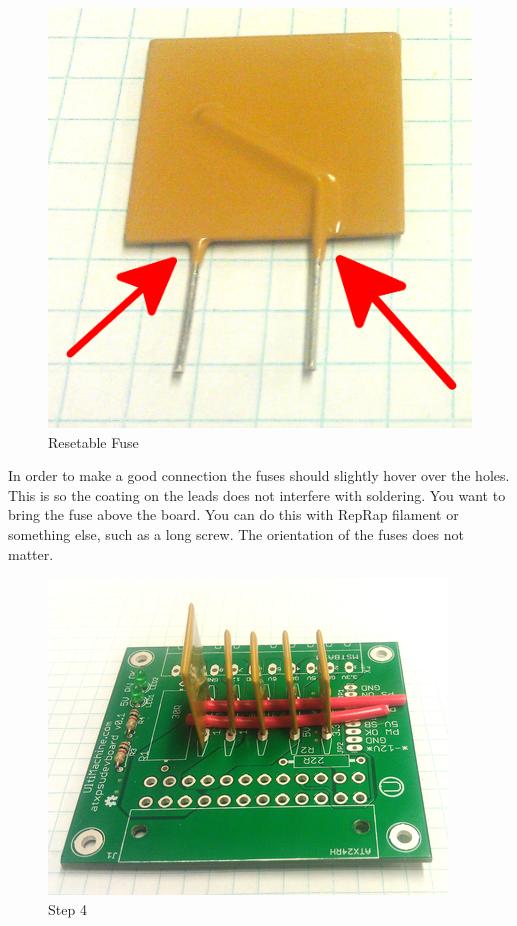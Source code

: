 \begin{figure}[htbp]
\centering
\includegraphics{./png/fuse.png}
\caption{Resetable Fuse}
\end{figure}

In order to make a good connection the fuses should slightly hover over
the holes. This is so the coating on the leads does not interfere with
soldering. You want to bring the fuse above the board. You can do this
with RepRap filament or something else, such as a long screw. The
orientation of the fuses does not matter.

\begin{figure}[htbp]
\centering
\includegraphics{./png/step-04.png}
\caption{Step 4}
\end{figure}

